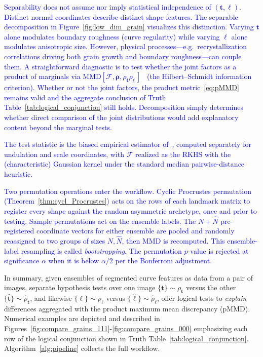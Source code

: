 \documentclass[pdflatex,iicol]{sn-jnl}%
\theoremstyle{thmstyleone}%
\theoremstyle{thmstyletwo}%
\theoremstyle{thmstylethree}%
\begin{document}
\textcolor{blue}{Separability does not assume nor imply statistical independence of $(\boldsymbol{t},\boldsymbol{\ell})$. Distinct normal coordinates describe distinct shape features. The separable decomposition in Figure~\ref{fig:low_dim_grain} visualizes this distinction. Varying $\boldsymbol{t}$ alone modulates boundary roughness (curve regularity) while varying $\boldsymbol{\ell}$ alone modulates anisotropic size. However, physical processes---e.g.\ recrystallization correlations driving both grain growth and boundary roughness---can couple them. A straightforward diagnostic is to test whether the joint factors as a product of marginals via $\text{MMD}[\mathcal{F},\boldsymbol{\rho},\rho_{\boldsymbol{t}}\rho_{\boldsymbol{\ell}}\,]$~\cite{gretton2012kernel} (the Hilbert--Schmidt information criterion). Whether or not the joint factors, the product metric~\eqref{eq:pMMD} remains valid and the aggregate conclusion of Truth Table~\ref{tab:logical_conjunction} still holds. Decomposition simply determines whether direct comparison of the joint distributions would add explanatory content beyond the marginal tests.}

\textcolor{blue}{The test statistic is the biased empirical estimator of~\cite{gretton2012kernel}, computed separately for undulation and scale coordinates, with $\mathcal{F}$ realized as the RKHS with the (characteristic) Gaussian kernel under the standard median pairwise-distance heuristic.}

\textcolor{blue}{Two permutation operations enter the workflow. Cyclic Procrustes permutation (Theorem~\ref{thm:cycl_Procrustes}) acts on the rows of each landmark matrix to register every shape against the random asymmetric archetype, once and prior to testing. Sample permutations act on the ensemble labels. The $N+\widehat{N}$ pre-registered coordinate vectors for either ensemble are pooled and randomly reassigned to two groups of sizes $N,\widehat{N}$, then MMD is recomputed. This ensemble-label resampling is called \textit{bootstrapping}. The permutation $p$-value is rejected at significance $\alpha$ when it is below $\alpha/2$ per the Bonferroni adjustment.}

In summary, given ensembles of segmented curve features as data from a pair of images, separate hypothesis tests over one image $\lbrace \boldsymbol{t} \rbrace \sim \rho_{\boldsymbol{t}}$ versus the other $\lbrace \widehat{\boldsymbol{t}}\rbrace \sim \widehat{\rho}_{\boldsymbol{t}}$, and likewise $\lbrace \boldsymbol{\ell} \rbrace \sim \rho_{\boldsymbol{\ell}}$ versus $\lbrace \widehat{\boldsymbol{\ell}}\rbrace \sim \widehat{\rho}_{\boldsymbol{\ell}}$, offer logical tests to \emph{explain} differences aggregated with the product maximum mean discrepancy (pMMD). Numerical examples are depicted and described in Figures~\ref{fig:compare_grains_111}-\ref{fig:compare_grains_000} emphasizing each row of the logical conjunction shown in Truth Table~\ref{tab:logical_conjunction}. Algorithm~\ref{alg:pipeline} collects the full workflow.
\end{document}
